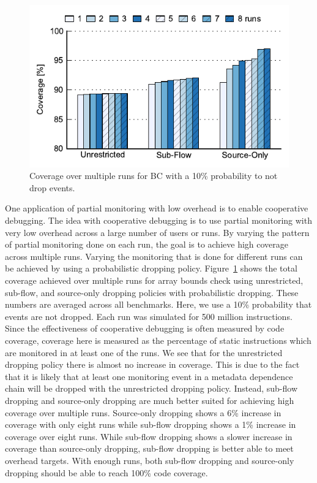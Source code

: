 \begin{figure}
  \begin{center}
    \includegraphics[width=\columnwidth]{figs/data_multirun_coverage.pdf}
    \vspace{-0.2in}
    \caption{Coverage over multiple runs for BC with a 10\% probability to not drop events.}
    \label{fig:evaluation.multirun}
    \vspace{-0.2in}
  \end{center}
\end{figure}

One application of partial monitoring with low overhead is to enable
cooperative debugging. 
The idea with cooperative debugging is to use partial
monitoring with very low overhead across a large number of users or runs. By
varying the pattern of partial monitoring done on each run, the goal is to
achieve high coverage across multiple runs. Varying the monitoring that is
done for different runs can be achieved by using a probabilistic dropping policy.
Figure~\ref{fig:evaluation.multirun} shows the total
coverage achieved over multiple runs for array bounds check using
unrestricted, sub-flow, and source-only dropping policies with probabilistic dropping.
These numbers are averaged across all benchmarks. Here, we use a 10\%
probability
that events are not dropped.  Each run
was simulated for 500 million instructions. 
Since the effectiveness of cooperative debugging is often measured by code coverage, coverage here is
measured as the percentage of static instructions which are monitored in at
least one of the runs.
We see that for the unrestricted dropping policy there is almost no increase in
coverage.  This is due to the fact that it is likely that at least one
monitoring event in a metadata dependence chain will be dropped with the unrestricted dropping
policy. 
Instead, sub-flow dropping and source-only
dropping are much better suited for achieving high coverage over multiple runs.
Source-only dropping shows a 6\% increase in coverage with only eight runs
while sub-flow dropping shows a 1\% increase in coverage over eight runs.
While sub-flow dropping shows a slower increase in coverage than source-only
dropping, sub-flow dropping is better able to meet overhead targets.
With enough runs, both sub-flow dropping and source-only dropping should be able to
reach 100\% code coverage.

